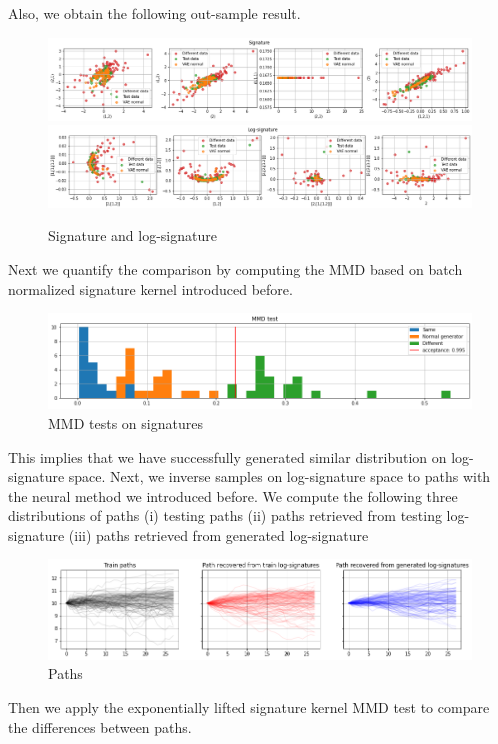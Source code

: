 \documentclass[12pt]{report}
\theoremstyle{definition}
\theoremstyle{remark}
\begin{document}
Also, we obtain the following out-sample result.
 \begin{figure}[H]
    \centering
    \includegraphics[width=\textwidth]{figs/cvae19.png}
    \includegraphics[width=\textwidth]{figs/cvae20.png}
    \caption{Signature and log-signature}
\end{figure}
Next we quantify the comparison by computing the MMD based on batch normalized signature kernel introduced before. 
\begin{figure}[H]
    \centering
    \includegraphics[width=\textwidth]{figs/cvae21.png}
    \caption{MMD tests on signatures}
\end{figure}
This implies that we have successfully generated similar distribution on log-signature space. Next, we inverse samples on log-signature space to paths with the neural method we introduced before. We compute the following three distributions of paths (i) testing paths (ii) paths retrieved from testing log-signature (iii) paths retrieved from generated log-signature
\begin{figure}[H]
    \centering
    \includegraphics[width=\textwidth]{figs/cvae24.png}
    \caption{Paths}
\end{figure}
Then we apply the exponentially lifted signature kernel MMD test to compare the differences between paths. 
\end{document}
